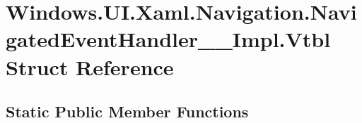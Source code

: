 \hypertarget{struct_windows_1_1_u_i_1_1_xaml_1_1_navigation_1_1_navigated_event_handler_____impl_1_1_vtbl}{}\section{Windows.\+U\+I.\+Xaml.\+Navigation.\+Navigated\+Event\+Handler\+\_\+\+\_\+\+Impl.\+Vtbl Struct Reference}
\label{struct_windows_1_1_u_i_1_1_xaml_1_1_navigation_1_1_navigated_event_handler_____impl_1_1_vtbl}
\subsection*{Static Public Member Functions}
